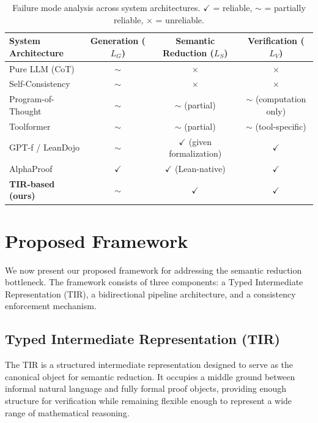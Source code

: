 \documentclass[11pt,a4paper]{article}
\begin{document}
\begin{table}[h]
\centering
\caption{Failure mode analysis across system architectures. $\checkmark$ = reliable, $\sim$ = partially reliable, $\times$ = unreliable.}
\label{tab:failuremodes}
\small
\begin{tabular}{lccc}
\toprule
\textbf{System Architecture} & \textbf{Generation ($L_G$)} & \textbf{Semantic Reduction ($L_S$)} & \textbf{Verification ($L_V$)} \\
\midrule
Pure LLM (CoT) & $\sim$ & $\times$ & $\times$ \\
Self-Consistency & $\sim$ & $\times$ & $\times$ \\
Program-of-Thought & $\sim$ & $\sim$ (partial) & $\sim$ (computation only) \\
Toolformer & $\sim$ & $\sim$ (partial) & $\sim$ (tool-specific) \\
GPT-f / LeanDojo & $\sim$ & $\checkmark$ (given formalization) & $\checkmark$ \\
AlphaProof & $\checkmark$ & $\checkmark$ (Lean-native) & $\checkmark$ \\
\textbf{TIR-based (ours)} & $\sim$ & $\checkmark$ & $\checkmark$ \\
\bottomrule
\end{tabular}
\end{table}

\section{Proposed Framework}
\label{sec:framework}

We now present our proposed framework for addressing the semantic reduction bottleneck. The framework consists of three components: a Typed Intermediate Representation (TIR), a bidirectional pipeline architecture, and a consistency enforcement mechanism.

\subsection{Typed Intermediate Representation (TIR)}
\label{sec:tir}

The TIR is a structured intermediate representation designed to serve as the canonical object for semantic reduction. It occupies a middle ground between informal natural language and fully formal proof objects, providing enough structure for verification while remaining flexible enough to represent a wide range of mathematical reasoning.
\end{document}
